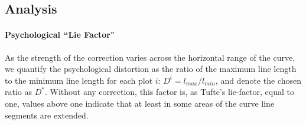\documentclass[journal]{vgtc}\usepackage{graphicx, color}
\newcommand{\hh}[1]{{\color{orange} #1}}
\begin{document}



\subsection{Analysis}
\paragraph{Psychological ``Lie Factor"}
As the strength of the correction varies across the horizontal range of the curve, we  quantify the psychological distortion as the ratio of the maximum line length to the minimum line length for each plot $i$: $D^i = l_{max}/l_{min}$, and denote the chosen ratio as $D^\ast$. 
Without any correction, this factor is, as Tufte's lie-factor, equal to one, values above one indicate that at least in some areas of the curve line segments are extended.

% 
\end{document}
